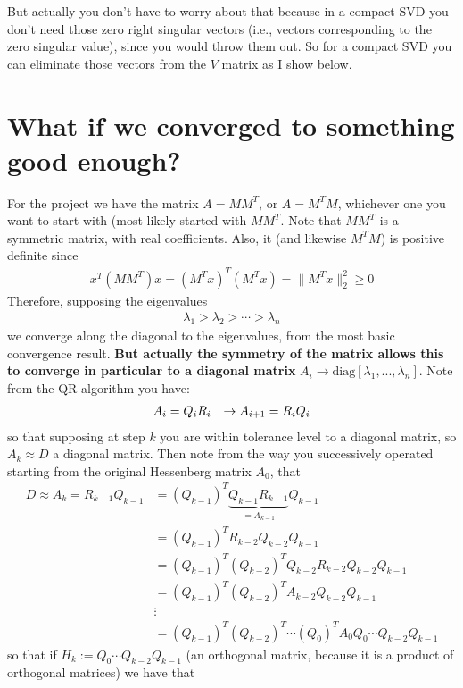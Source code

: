 \documentclass[11.5pt]{article}
\theoremstyle{definition}
\begin{document}
But actually you don't have to worry about that because in a compact SVD you don't need those zero right singular vectors (i.e., vectors corresponding to the zero singular value), since you would throw them out. So for a compact SVD you can eliminate those vectors from the $V$ matrix as I show below.


\section{What if we converged to something good enough?}

For the project we have the matrix $A=MM^T$, or $A=M^TM$, whichever one you want to start with (most likely started with $MM^T$. Note that $MM^T$ is a symmetric matrix, with real coefficients. Also, it (and likewise $M^TM$) is positive definite since
\begin{align*}
x^T(MM^T)x= (M^Tx)^T (M^T x)=\|M^Tx\|^2_2\geq 0
\end{align*}
 Therefore, supposing the eigenvalues
\begin{align*}
\lambda_1>\lambda_2> \cdots >\lambda_n
\end{align*}
we converge along the diagonal to the eigenvalues, from the most basic convergence result. \textbf{But actually the symmetry of the matrix allows this to converge in particular to a diagonal matrix} $A_i\rightarrow \text{diag}[\lambda_1,...,\lambda_n]$. Note from the QR algorithm you have:
\begin{align*}
A_i=Q_i R_i\hspace{0.1in}\rightarrow
A_{i+1}=R_{i}Q_i
\end{align*}
so that supposing at step $k$ you are within tolerance level to a diagonal matrix, so $A_k\approx D$ a diagonal matrix. Then note from the way you successively operated starting from the original Hessenberg matrix $A_0$, that 
\begin{align*}
D\approx A_k=R_{k-1} Q_{k-1}&=(Q_{k-1})^T \underbrace{Q_{k-1} R_{k-1}}_{=A_{k-1}} Q_{k-1}\\
 &= (Q_{k-1})^T R_{k-2}Q_{k-2}Q_{k-1}\\
 &=(Q_{k-1})^T(Q_{k-2})^T Q_{k-2}R_{k-2}Q_{k-2}Q_{k-1}\\
 &=(Q_{k-1})^T(Q_{k-2})^T A_{k-2}Q_{k-2}Q_{k-1}\\
 &\vdots  \\
 &= (Q_{k-1})^T(Q_{k-2})^T\cdots (Q_{0})^T A_{0} Q_0\cdots Q_{k-2}Q_{k-1}
\end{align*}
so that if $H_k:= Q_0\cdots Q_{k-2}Q_{k-1}$ (an orthogonal matrix, because it is a product of orthogonal matrices) we have that
\end{document}
